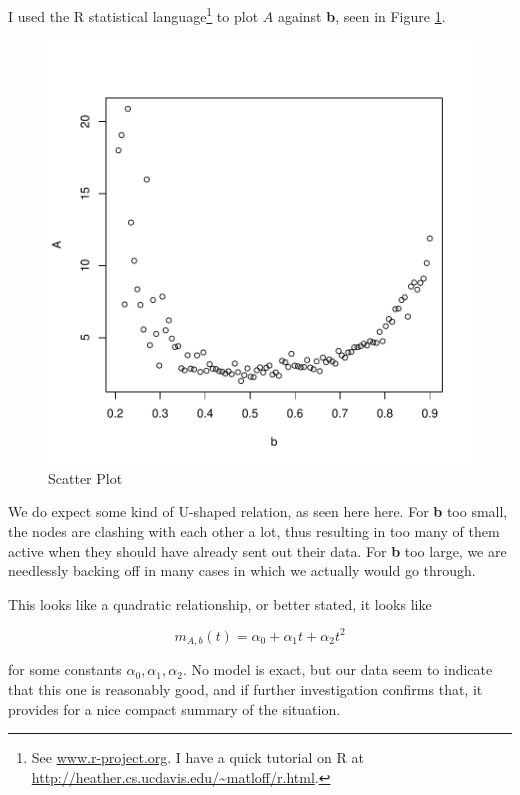 I used the R statistical language\footnote{See \url{www.r-project.org}.
I have a quick tutorial on R at
\url{http://heather.cs.ucdavis.edu/~matloff/r.html}.} to plot $A$
against {\bf b}, seen in Figure \ref{scatter}. 

\begin{figure}[tb]
\centerline{
\includegraphics[width=5.0in]{Aloha1.pdf}
}
\caption{Scatter Plot}
\label{scatter}
\end{figure}


We do expect some kind of U-shaped relation, as seen here here.  For
{\bf b} too small, the nodes are clashing with each other a lot, thus
resulting in too many of them active when they should have already sent
out their data.  For {\bf b} too large, we are needlessly backing off in
many cases in which we actually would go through.

This looks like a quadratic relationship, or better stated, it looks
like  

\begin{equation}
\label{quad}
m_{A,b}(t) = \alpha_0 + \alpha_1 t + \alpha_2 t^2
\end{equation}

for some constants $\alpha_0, \alpha_1, \alpha_2$.  No model is exact,
but our data seem to indicate that this one is reasonably good, and if
further investigation confirms that, it provides for a nice compact
summary of the situation.  

